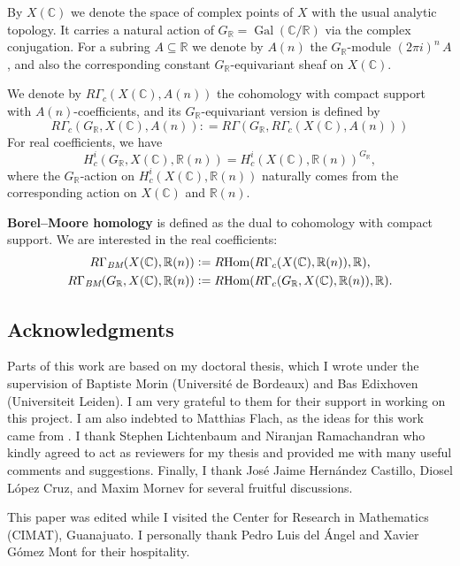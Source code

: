 \documentclass[10pt,a4paper,oneside]{article}
\DeclareMathOperator{\Gal}{Gal}
\DeclareMathOperator{\Hom}{Hom}
\newcommand{\CC}{\mathbb{C}}
\newcommand{\RR}{\mathbb{R}}
\newcommand{\BM}{\text{\it BM}}
\newcommand{\dfn}{\mathrel{\mathop:}=}
\newcommand{\RHom}{R\!\Hom}
\theoremstyle{myplain}
\theoremstyle{mydefinition}
\numberwithin{equation}{section}
\begin{document}
By $X (\CC)$ we denote the space of complex points of $X$ with the usual
analytic topology. It carries a natural action of $G_\RR = \Gal (\CC/\RR)$ via
the complex conjugation. For a subring $A \subseteq \RR$ we denote by $A (n)$
the $G_\RR$-module $(2\pi i)^n\,A$, and also the corresponding constant
$G_\RR$-equivariant sheaf on $X (\CC)$.

We denote by $R\Gamma_c (X (\CC), A (n))$ the cohomology with compact support
with $A (n)$-coefficients, and its $G_\RR$-equivariant version is defined by
$$R\Gamma_c (G_\RR, X (\CC), A (n)) \dfn R\Gamma (G_\RR, R\Gamma_c (X (\CC), A (n)))$$
For real coefficients, we have
$$H_c^i (G_\RR, X (\CC), \RR (n)) = H^i_c (X (\CC), \RR (n))^{G_\RR},$$
where the $G_\RR$-action on $H^i_c (X (\CC), \RR (n))$ naturally comes from the
corresponding action on $X (\CC)$ and $\RR (n)$.

\textbf{Borel--Moore homology} is defined as the dual to cohomology with compact
support. We are interested in the real coefficients:
\begin{align*}
  R\Gamma_\BM (X (\CC), \RR (n)) & \dfn
  \RHom (R\Gamma_c (X (\CC), \RR (n)), \RR), \\
  R\Gamma_\BM (G_\RR, X (\CC), \RR (n)) & \dfn
  \RHom (R\Gamma_c (G_\RR, X (\CC), \RR (n)), \RR).
\end{align*}

\subsection*{Acknowledgments}

Parts of this work are based on my doctoral thesis, which I wrote under the
supervision of Baptiste Morin (Universit\'{e} de Bordeaux) and Bas Edixhoven
(Universiteit Leiden). I am very grateful to them for their support in working
on this project. I am also indebted to Matthias Flach, as the ideas for this
work came from \cite{Flach-Morin-2018}. I thank Stephen Lichtenbaum and Niranjan
Ramachandran who kindly agreed to act as reviewers for my thesis and provided me
with many useful comments and suggestions. Finally, I thank Jos\'{e} Jaime
Hern\'{a}ndez Castillo, Diosel L\'{o}pez Cruz, and Maxim Mornev for several
fruitful discussions.

This paper was edited while I visited the Center for Research in Mathematics
(CIMAT), Guanajuato. I personally thank Pedro Luis del \'{A}ngel and
Xavier G\'{o}mez Mont for their hospitality.

\end{document}
